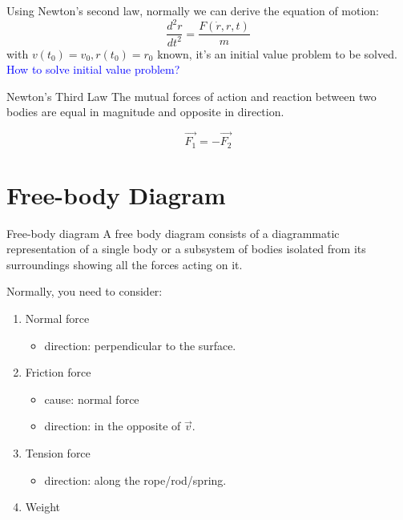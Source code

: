 \documentclass{beamer}
\begin{document}
\begin{frame}
  Using Newton's second law, normally we can derive the equation of motion:
  $$\frac{d^2r}{dt^2}=\frac{F(\dot{r},r,t)}{m}$$ with $v(t_0) = v_0, r(t_0) = r_0$ known, it's an initial value problem to be solved.\\\textcolor{blue}{How to solve initial value problem?}
  \begin{block}{Newton's Third Law}
    The mutual forces of action and reaction between two bodies are equal in magnitude and opposite in direction.
  \end{block}
  $$
  \vec{F_1} = -\vec{F_2}
  $$
\end{frame}

\section{Free-body Diagram}
\begin{frame}
  \begin{block}{Free-body diagram}
    A free body diagram consists of a diagrammatic representation of a single body or a subsystem of bodies isolated from its surroundings showing all the forces acting on it.
  \end{block}
  Normally, you need to consider:
  \begin{enumerate}
    \item Normal force
    \begin{itemize}
      \item direction: perpendicular to the surface.
    \end{itemize}
    \item Friction force
    \begin{itemize}
      \item cause: normal force
      \item direction: in the opposite of $\vec{v}$.
    \end{itemize}
    \item Tension force
    \begin{itemize}
      \item direction: along the rope/rod/spring.
    \end{itemize}
    \item Weight
  \end{enumerate}
\end{frame}
\end{document}

